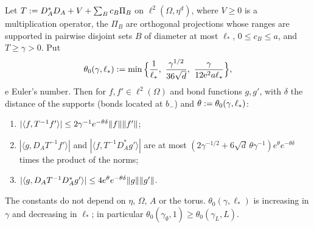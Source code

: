 \begin{lemma}\label{lem:a06A:CT}
Let $T:= D_A^*D_A+V+\sum_Bc_B\Pi_B$ on $\ell^2(\Omega,\eta^d)$, where $V\ge0$ is a multiplication operator, the $\Pi_B$ are orthogonal projections whose ranges are supported in pairwise disjoint sets $B$ of diameter at most $\ell_*$, $0\le c_B\le a$, and $T\ge\gamma>0$. Put
\[
\theta_0(\gamma,\ell_*)\defeq\min\Big\{\frac1{\ell_*},\ \frac{\gamma^{1/2}}{36\sqrt d},\ \frac{\gamma}{12\mathrm e^2a\ell_*}\Big\},
\]
$\mathrm e$ Euler's number. Then for $f,f'\in\ell^2(\Omega)$ and bond functions $g,g'$, with $\delta$ the distance of the supports (bonds located at $b_-$) and $\theta:=\theta_0(\gamma,\ell_*)$:
\begin{enumerate}[label=\textup{(\roman*)},nosep,leftmargin=*]
\item $|\langle f,T^{-1}f'\rangle|\le2\gamma^{-1}e^{-\theta\delta}\lVert f\rVert\lVert f'\rVert$;
\item $|\langle g,D_AT^{-1}f'\rangle|$ and $|\langle f,T^{-1}D_A^*g'\rangle|$ are at most $(2\gamma^{-1/2}+6\sqrt d\,\theta\gamma^{-1})e^{\theta}e^{-\theta\delta}$ times the product of the norms;
\item $|\langle g,D_AT^{-1}D_A^*g'\rangle|\le4e^{\theta}e^{-\theta\delta}\lVert g\rVert\lVert g'\rVert$.
\end{enumerate}
The constants do not depend on $\eta$, $\Omega$, $A$ or the torus. $\theta_0(\gamma,\ell_*)$ is increasing in $\gamma$ and decreasing in $\ell_*$; in particular $\theta_0(\gamma_\emptyset,1)\ge\theta_0(\gamma_L,L)$.
\end{lemma}

